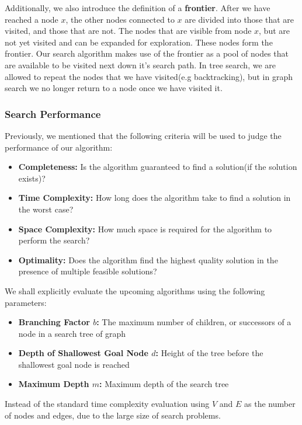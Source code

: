 \documentclass[12pt]{article}
\begin{document}
Additionally, we also introduce the definition of a \textbf{frontier}. After we have reached a node $x$, the other nodes connected to $x$ are divided into those that are visited, and those that are not. The nodes that are visible from node $x$, but are not yet visited and can be expanded for exploration. These nodes form the frontier. Our search algorithm makes use of the frontier as a pool of nodes that are available to be visited next down it's search path. In tree search, we are allowed to repeat the nodes that we have visited(e.g backtracking), but in graph search we no longer return to a node once we have visited it.

\subsubsection{Search Performance}

Previously, we mentioned that the following criteria will be used to judge the performance of our algorithm:

\begin{itemize}
\item \textbf{Completeness:} Is the algorithm guaranteed to find a solution(if the solution exists)?
\item \textbf{Time Complexity:} How long does the algorithm take to find a solution in the worst case?
\item \textbf{Space Complexity:} How much space is required for the algorithm to perform the search?	
\item \textbf{Optimality:} Does the algorithm find the highest quality solution in the presence of multiple feasible solutions?
\end{itemize}

We shall explicitly evaluate the upcoming algorithms using the following parameters:

\begin{itemize}
\item \textbf{Branching Factor $b$:} The maximum number of children, or successors of a node in a search tree of graph
\item \textbf{Depth of Shallowest Goal Node $d$:} Height of the tree before the shallowest goal node is reached
\item \textbf{Maximum Depth $m$:} Maximum depth of the search tree
\end{itemize}

Instead of the standard time complexity evaluation using $V$ and $E$ as the number of nodes and edges, due to the large size of search problems.
\end{document}
